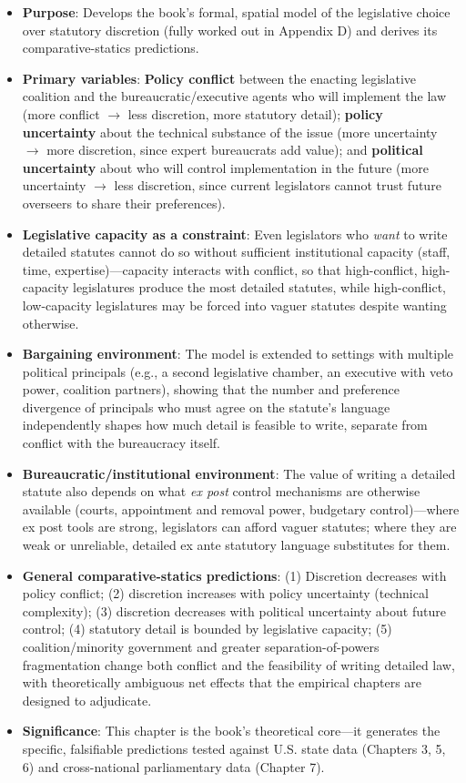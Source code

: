 \documentclass[12pt]{article}
\begin{document}
\begin{itemize}[leftmargin=*, itemsep=4pt]
    \item \textbf{Purpose}: Develops the book's formal, spatial model of the legislative choice over statutory discretion (fully worked out in Appendix D) and derives its comparative-statics predictions.
    \item \textbf{Primary variables}: \textbf{Policy conflict} between the enacting legislative coalition and the bureaucratic/executive agents who will implement the law (more conflict $\to$ less discretion, more statutory detail); \textbf{policy uncertainty} about the technical substance of the issue (more uncertainty $\to$ more discretion, since expert bureaucrats add value); and \textbf{political uncertainty} about who will control implementation in the future (more uncertainty $\to$ less discretion, since current legislators cannot trust future overseers to share their preferences).
    \item \textbf{Legislative capacity as a constraint}: Even legislators who \emph{want} to write detailed statutes cannot do so without sufficient institutional capacity (staff, time, expertise)---capacity interacts with conflict, so that high-conflict, high-capacity legislatures produce the most detailed statutes, while high-conflict, low-capacity legislatures may be forced into vaguer statutes despite wanting otherwise.
    \item \textbf{Bargaining environment}: The model is extended to settings with multiple political principals (e.g., a second legislative chamber, an executive with veto power, coalition partners), showing that the number and preference divergence of principals who must agree on the statute's language independently shapes how much detail is feasible to write, separate from conflict with the bureaucracy itself.
    \item \textbf{Bureaucratic/institutional environment}: The value of writing a detailed statute also depends on what \emph{ex post} control mechanisms are otherwise available (courts, appointment and removal power, budgetary control)---where ex post tools are strong, legislators can afford vaguer statutes; where they are weak or unreliable, detailed ex ante statutory language substitutes for them.
    \item \textbf{General comparative-statics predictions}: (1) Discretion decreases with policy conflict; (2) discretion increases with policy uncertainty (technical complexity); (3) discretion decreases with political uncertainty about future control; (4) statutory detail is bounded by legislative capacity; (5) coalition/minority government and greater separation-of-powers fragmentation change both conflict and the feasibility of writing detailed law, with theoretically ambiguous net effects that the empirical chapters are designed to adjudicate.
    \item \textbf{Significance}: This chapter is the book's theoretical core---it generates the specific, falsifiable predictions tested against U.S. state data (Chapters 3, 5, 6) and cross-national parliamentary data (Chapter 7).
\end{itemize}
\end{document}
